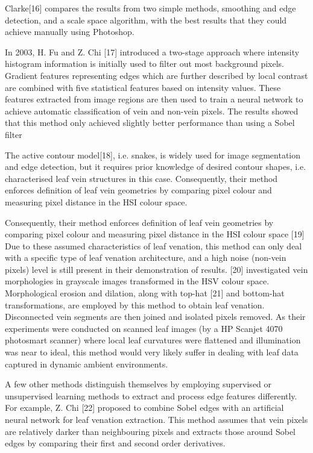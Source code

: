 \documentclass{report}
\begin{document}
{Clarke[16] compares the results from two simple methods, smoothing
and edge detection, and a scale space algorithm, with the best results
that they could achieve manually using Photoshop.

In 2003, H. Fu and Z. Chi [17] introduced a two-stage approach where
intensity histogram information is initially used to filter out most
background pixels. Gradient features representing edges which are
further described by local contrast are combined with five statistical
features based on intensity values. These features extracted from image
regions are then used to train a neural network to achieve automatic
classification of vein and non-vein pixels. The results showed that this
method only achieved slightly better performance than using a Sobel
filter

The active contour model[18], i.e. snakes, is widely used for image
segmentation and edge detection, but it requires prior knowledge of
desired contour shapes, i.e. characterised leaf vein structures in this
case. Consequently, their method enforces definition of leaf vein
geometries by comparing pixel colour and measuring pixel distance in
the HSI colour space.

Consequently, their method enforces definition of leaf vein geometries
by comparing pixel colour and measuring pixel distance in the HSI
colour space [19] Due to these assumed characteristics of leaf venation,
this method can only deal with a specific type of leaf venation
architecture, and a high noise (non-vein pixels) level is still present in
their demonstration of results. [20] investigated vein morphologies in
grayscale images transformed in the HSV colour space.
Morphological erosion and dilation, along with top-hat [21] and
bottom-hat transformations, are employed by this method to obtain leaf venation. Disconnected vein segments are then joined and isolated
pixels removed. As their experiments were conducted on scanned leaf
images (by a HP Scanjet 4070 photosmart scanner) where local leaf
curvatures were flattened and illumination was near to ideal, this
method would very likely suffer in dealing with leaf data captured in
dynamic ambient environments.

A few other methods distinguish themselves by employing supervised
or unsupervised learning methods to extract and process edge features
differently. For example, Z. Chi [22] proposed to combine Sobel edges
with an artificial neural network for leaf venation extraction. This
method assumes that vein pixels are relatively darker than neighbouring
pixels and extracts those around Sobel edges by comparing their first
and second order derivatives.

}
\end{document}

